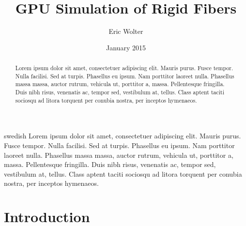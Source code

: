 \documentclass[a4paper,11pt]{kth-mag}
\title{GPU Simulation of Rigid Fibers}
\author{Eric Wolter}
\date{January 2015}
\begin{document}
\frontmatter
\pagestyle{empty}

\maketitle
{}
\begin{abstract}
Lorem ipsum dolor sit amet, consectetuer adipiscing elit. Mauris
purus. Fusce tempor. Nulla facilisi. Sed at turpis. Phasellus eu
ipsum. Nam porttitor laoreet nulla. Phasellus massa massa, auctor
rutrum, vehicula ut, porttitor a, massa. Pellentesque fringilla. Duis
nibh risus, venenatis ac, tempor sed, vestibulum at, tellus. Class
aptent taciti sociosqu ad litora torquent per conubia nostra, per
inceptos hymenaeos.
\end{abstract}

\clearpage


\begin{foreignabstract}{swedish}
Lorem ipsum dolor sit amet, consectetuer adipiscing elit. Mauris
purus. Fusce tempor. Nulla facilisi. Sed at turpis. Phasellus eu
ipsum. Nam porttitor laoreet nulla. Phasellus massa massa, auctor
rutrum, vehicula ut, porttitor a, massa. Pellentesque fringilla. Duis
nibh risus, venenatis ac, tempor sed, vestibulum at, tellus. Class
aptent taciti sociosqu ad litora torquent per conubia nostra, per
inceptos hymenaeos.
\end{foreignabstract}

\clearpage

\tableofcontents*

\clearpage

\listoflistings

\mainmatter
\pagestyle{newchap}

\chapter{Introduction}
\end{document}
